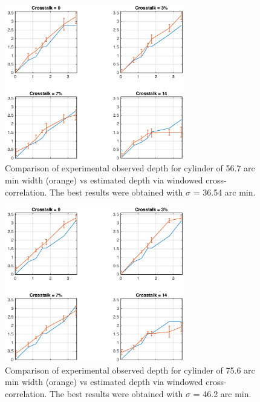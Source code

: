 \begin{figure}[H]
\centering
    \includegraphics[width=0.7\textwidth]{./Template_Figures/s_27_sigma_17_4}
    \caption{Comparison of experimental observed depth for cylinder of 56.7 arc min width (orange) vs estimated depth via windowed cross-correlation. The best results were obtained with $\sigma$ = 36.54 arc min.\label{fig:s_27_sigma_17_4}}
\end{figure}
\begin{figure}[H]
\centering
    \includegraphics[width=0.7\textwidth]{./Template_Figures/s_36_sigma_22}
    \caption{Comparison of experimental observed depth for cylinder of 75.6 arc min width (orange) vs estimated depth via windowed cross-correlation. The best results were obtained with $\sigma$ = 46.2 arc min.\label{fig:s_36_sigma_22}}
\end{figure}

